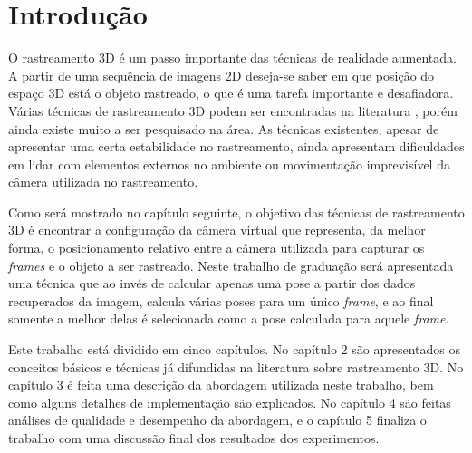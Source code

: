 \chapter{Introdução}

O rastreamento 3D é um passo importante das técnicas de realidade aumentada. A partir de uma sequência de imagens 2D deseja-se saber em que posição do espaço 3D está o objeto rastreado, o que é uma tarefa importante e desafiadora. Várias técnicas de rastreamento 3D podem ser encontradas na literatura \cite{lepetit}, porém ainda existe muito a ser pesquisado na área. As técnicas existentes, apesar de apresentar uma certa estabilidade no rastreamento, ainda apresentam dificuldades em lidar com elementos externos no ambiente ou movimentação imprevisível da câmera utilizada no rastreamento.

Como será mostrado no capítulo seguinte, o objetivo das técnicas de rastreamento 3D é encontrar a configuração da câmera virtual que representa, da melhor forma, o posicionamento relativo entre a câmera utilizada para capturar os \emph{frames} e o objeto a ser rastreado. Neste trabalho de graduação será apresentada uma técnica que ao invés de calcular apenas uma pose a partir dos dados recuperados da imagem, calcula várias poses para um único \emph{frame}, e ao final somente a melhor delas é selecionada como a pose calculada para aquele \emph{frame}.

Este trabalho está dividido em cinco capítulos. No capítulo 2 são apresentados os conceitos básicos e técnicas já difundidas na literatura sobre rastreamento 3D. No capítulo 3 é feita uma descrição da abordagem utilizada neste trabalho, bem como alguns detalhes de implementação são explicados. No capítulo 4 são feitas análises de qualidade e desempenho da abordagem, e o capítulo 5 finaliza o trabalho com uma discussão final dos resultados dos experimentos.
